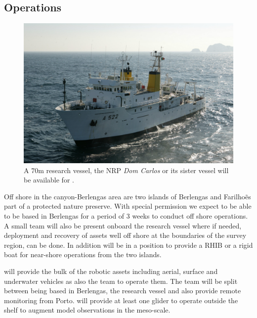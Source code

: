 \subsection{\proj Operations}
 

\begin{figure}
  \vspace{-0.8cm}
  \centering
  \includegraphics[scale=1.75]{fig/dom-carlos.jpg}
  \caption{A 70m research vessel, the NRP \emph{Dom Carlos} or its
    sister vessel will be available for \proje.}
  \vspace{-0.3cm}
 \label{fig:vessel}
\end{figure}

Off shore in the \naz canyon-Berlengas area are two islands of Berlengas
and Farilho\~es part of a protected nature preserve. With special
permission we expect to be able to be based in Berlengas for a period of
3 weeks to conduct off shore operations. A small team will also be
present onboard the \inst research vessel where if needed, deployment
and recovery of assets well off shore at the boundaries of the survey
region, can be done. In addition \inst will be in a position to provide
a RHIB or a rigid boat for near-shore operations from the two islands.

\univ will provide the bulk of the robotic assets including aerial,
surface and underwater vehicles as also the team to operate them. The
team will be split between being based in Berlengas, the research vessel
and also provide remote monitoring from Porto. \soc will provide at
least one glider to operate outside the shelf to augment model
observations in the meso-scale.

